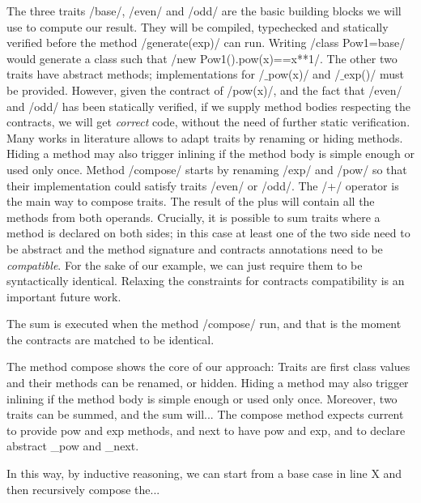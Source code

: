 The three traits /base/, /even/ and /odd/ are the basic building blocks we will use to compute our result. They will be compiled, typechecked and statically verified before the method /generate(exp)/ can run.
Writing /class Pow1=base/ would generate a class such that /new Pow1().pow(x)==x**1/.
The other two traits have abstract methods; implementations for /$\_$pow(x)/ and /$\_$exp()/ must be provided. However, given the contract of /pow(x)/,
and the fact that /even/ and /odd/ has been statically verified,
if we supply method bodies respecting the contracts, we will get \emph{correct} code, without the need of further static verification.
Many works in literature allows to adapt traits by renaming or hiding methods. Hiding a method may also trigger inlining if the method body is simple enough or used only once.
Method /compose/ starts by renaming /exp/ and /pow/
so that their implementation could satisfy traits 
/even/ or /odd/.
The /+/ operator is the main way to compose traits.
The result of the plus will contain all the methods from both operands.
Crucially, it is possible to sum traits where a method is declared on both sides; in this case at least one of the two side need to be abstract and the method signature and contracts annotations need to be \emph{compatible}.
For the sake of our example, we can just require them to be syntactically identical. Relaxing the constraints for 
contracts compatibility is an important future work.

The sum is executed when the method /compose/ run, and that is the moment the contracts are matched to be identical.



The method compose shows the core of our approach:
Traits are first class values and their methods
can be renamed, or hidden. Hiding a method may also trigger inlining if the method body is simple enough or used only once.
Moreover, two traits can be summed, and the sum will...
The compose method expects current to provide pow and exp methods, and next to have pow and exp, and to declare abstract _pow and _next.

In this way, by inductive reasoning, we can start from a base case in line X and then recursively compose the...
%
